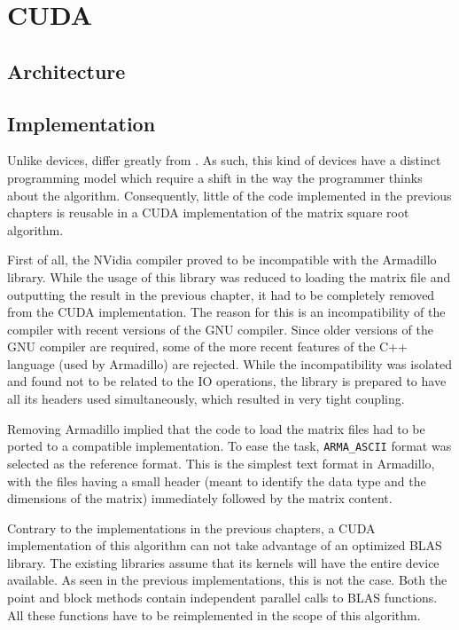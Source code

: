 \documentclass[../thesis]{subfiles}
\begin{document}
	\chapter{CUDA}
	\label{chp:cuda}

	\section{Architecture}
	\section{Implementation}
	Unlike \mic devices, \gpus differ greatly from \cpus. As such, this kind of devices have a distinct programming model which require a shift in the way the programmer thinks about the algorithm. Consequently, little of the code implemented in the previous chapters is reusable in a CUDA implementation of the matrix square root algorithm.

	First of all, the NVidia compiler proved to be incompatible with the Armadillo library. While the usage of this library was reduced to loading the matrix file and outputting the result in the previous chapter, it had to be completely removed from the CUDA implementation. The reason for this is an incompatibility of the \nvidia compiler with recent versions of the GNU compiler. Since older versions of the GNU compiler are required, some of the more recent features of the C++ language (used by Armadillo) are rejected. While the incompatibility was isolated and found not to be related to the IO operations, the library is prepared to have all its headers used simultaneously, which resulted in very tight coupling.

	Removing Armadillo implied that the code to load the matrix files had to be ported to a compatible implementation. To ease the task, \texttt{ARMA\_ASCII} format was selected as the reference format. This is the simplest text format in Armadillo, with the files having a small header (meant to identify the data type and the dimensions of the matrix) immediately followed by the matrix content.

	Contrary to the implementations in the previous chapters, a CUDA implementation of this algorithm can not take advantage of an optimized BLAS library. The existing libraries assume that its kernels will have the entire device available. As seen in the previous implementations, this is not the case. Both the point and block methods contain independent parallel calls to BLAS functions. All these functions have to be reimplemented in the scope of this algorithm.
\end{document}

